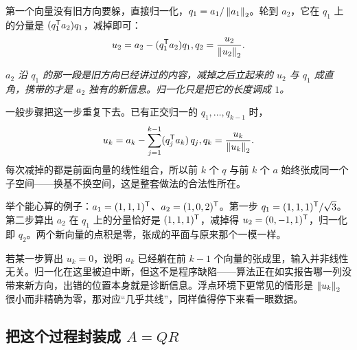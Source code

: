 第一个向量没有旧方向要躲，直接归一化，\(q_1=a_1/\left\lVert a_1\right\rVert_2\)。轮到 \(a_2\)，它在 \(q_1\) 上的分量是 \((q_1^{\mathsf{T}}a_2)q_1\)，减掉即可：
\[
u_2=a_2-(q_1^{\mathsf{T}}a_2)q_1,
\space
q_2=\frac{u_2}{\left\lVert u_2\right\rVert_2}.
\]

\begin{center}

\emph{\(a_2\) 沿 \(q_1\) 的那一段是旧方向已经讲过的内容，减掉之后立起来的 \(u_2\) 与 \(q_1\) 成直角，携带的才是 \(a_2\) 独有的新信息。归一化只是把它的长度调成 \(1\)。}
\end{center}

一般步骤把这一步重复下去。已有正交归一的 \(q_1,\ldots,q_{k-1}\) 时，
\[
u_k=a_k-\sum_{j=1}^{k-1}(q_j^{\mathsf{T}}a_k)\,q_j,
\space
q_k=\frac{u_k}{\left\lVert u_k\right\rVert_2}.
\]
每次减掉的都是前面向量的线性组合，所以前 \(k\) 个 \(q\) 与前 \(k\) 个 \(a\) 始终张成同一个子空间——换基不换空间，这是整套做法的合法性所在。

举个能心算的例子：\(a_1=(1,1,1)^{\mathsf{T}}\)、\(a_2=(1,0,2)^{\mathsf{T}}\)。第一步 \(q_1=(1,1,1)^{\mathsf{T}}/\sqrt3\)。第二步算出 \(a_2\) 在 \(q_1\) 上的分量恰好是 \((1,1,1)^{\mathsf{T}}\)，减掉得 \(u_2=(0,-1,1)^{\mathsf{T}}\)，归一化即 \(q_2\)。两个新向量的点积是零，张成的平面与原来那个一模一样。

若某一步算出 \(u_k=0\)，说明 \(a_k\) 已经躺在前 \(k-1\) 个向量的张成里，输入并非线性无关。归一化在这里被迫中断，但这不是程序缺陷——算法正在如实报告哪一列没带来新方向，出错的位置本身就是诊断信息。浮点环境下更常见的情形是 \(\left\lVert u_k\right\rVert_2\) 很小而非精确为零，那对应``几乎共线''，同样值得停下来看一眼数据。

\subsection{把这个过程封装成 \texorpdfstring{\(A=QR\)}{A=QR}}

